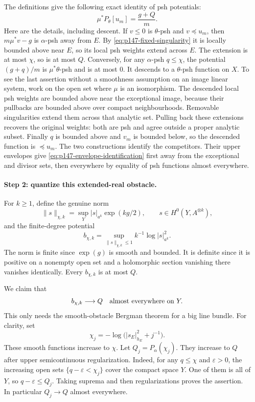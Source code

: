 The definitions give the following exact identity of psh potentials:
\begin{equation}\label{eq:p147-envelope-identification}
                   \mu^*P_\theta[u_m]=\frac{g+Q}{m}.
\end{equation}
Here are the details, including descent.
If \(v\leq0\) is \(\theta\)-psh and \(v\preceq u_m\), then
\(m\mu^*v-g\) is \(\alpha\)-psh away from \(E\).
By \eqref{eq:p147-fixed-singularity} it is locally bounded above near
\(E\), so its local psh weights extend across \(E\).
The extension is at most \(\chi\), so is at most \(Q\).
Conversely, for any \(\alpha\)-psh \(q\leq\chi\), the potential
\((g+q)/m\) is \(\mu^*\theta\)-psh and is at most \(0\).
It descends to a \(\theta\)-psh function on \(X\).
To see the last assertion without a smoothness assumption on an image
linear system, work on the open set where \(\mu\) is an isomorphism.
The descended local psh weights are bounded above near the exceptional
image, because their pullbacks are bounded above over compact
neighbourhoods.  Removable singularities extend them across that analytic
set.  Pulling back these extensions recovers the original weights:
both are psh and agree outside a proper analytic subset.
Finally \(q\) is bounded above and \(v_m\) is bounded below, so the
descended function is \(\preceq u_m\).
The two constructions identify the competitors.
Their upper envelopes give \eqref{eq:p147-envelope-identification}
first away from the exceptional and divisor sets, then everywhere by
equality of psh functions almost everywhere.

\paragraph{Step 2: quantize this extended-real obstacle.}
For \(k\geq1\), define the genuine norm
\[
 \|s\|_{\chi,k}
   =\sup_Y |s|_{a^k}\exp(kg/2),\qquad s\in H^0(Y,A^{\otimes k}),
\]
and the finite-degree potential
\[
 b_{\chi,k}
  =\sup_{\|s\|_{\chi,k}\leq1}k^{-1}\log|s|_{a^k}^2.
\]
The norm is finite since \(\exp(g)\) is smooth and bounded.
It is definite since it is positive on a nonempty open set and a
holomorphic section vanishing there vanishes identically.
Every \(b_{\chi,k}\) is at most \(Q\).

We claim that
\begin{equation}\label{eq:p147-extended-obstacle-quantization}
                         b_{\chi,k}\longrightarrow Q
                  \quad\hbox{almost everywhere on }Y.
\end{equation}
This only needs the smooth-obstacle Bergman theorem for a big line bundle.
For clarity, set
\[
             \chi_j=-\log\bigl(|s_E|_{h_E}^2+j^{-1}\bigr).
\]
These smooth functions increase to \(\chi\).
Let \(Q_j=P_\alpha(\chi_j)\).
They increase to \(Q\) after upper semicontinuous regularization.
Indeed, for any \(q\leq\chi\) and \(\varepsilon>0\), the increasing open
sets
\(\{q-\varepsilon<\chi_j\}\) cover the compact space \(Y\).
One of them is all of \(Y\), so \(q-\varepsilon\leq Q_j\).
Taking suprema and then regularizations proves the assertion.
In particular \(Q_j\to Q\) almost everywhere.

